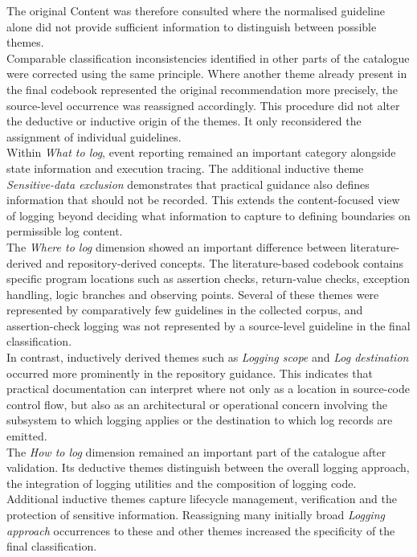 The original Content was therefore consulted where the normalised guideline alone did not provide sufficient information to distinguish between possible themes.
\\
Comparable classification inconsistencies identified in other parts of the catalogue were corrected using the same principle. 
Where another theme already present in the final codebook represented the original recommendation more precisely, the source-level occurrence was reassigned accordingly. 
This procedure did not alter the deductive or inductive origin of the themes. It only reconsidered the assignment of individual guidelines.
\\
Within \textit{What to log}, event reporting remained an important category alongside state information and execution tracing. 
The additional inductive theme \textit{Sensitive-data exclusion} demonstrates that practical guidance also defines information that should not be recorded. 
This extends the content-focused view of logging beyond deciding what information to capture to defining boundaries on permissible log content.
\\
The \textit{Where to log} dimension showed an important difference between literature-derived and repository-derived concepts. 
The literature-based codebook contains specific program locations such as assertion checks, return-value checks, exception handling, logic branches and observing points. 
Several of these themes were represented by comparatively few guidelines in the collected corpus, and assertion-check logging was not represented by a source-level guideline in the final classification.
\\
In contrast, inductively derived themes such as \textit{Logging scope} and \textit{Log destination} occurred more prominently in the repository guidance. 
This indicates that practical documentation can interpret where not only as a location in source-code control flow, but also as an architectural or operational concern involving the subsystem to which logging applies or the destination to which log records are emitted.
\\
The \textit{How to log} dimension remained an important part of the catalogue after validation. 
Its deductive themes distinguish between the overall logging approach, the integration of logging utilities and the composition of logging code. 
Additional inductive themes capture lifecycle management, verification and the protection of sensitive information. 
Reassigning many initially broad \textit{Logging approach} occurrences to these and other themes increased the specificity of the final classification.
